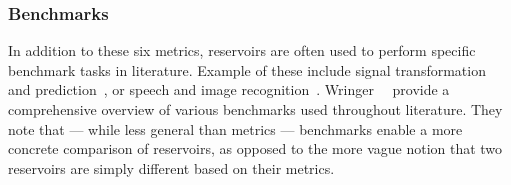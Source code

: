 \subsubsection{Benchmarks} %
In addition to these six metrics, reservoirs are often used to perform specific benchmark tasks in literature.
Example of these include signal transformation and prediction~\cite{AdaptiveProgrammableRC,jaeger2001echo,JaegerHaasWireless,RC_MemristorTemporal,Sunspots_Shougat,gartside2022reconfigurable,appeltant2011information,Vidamour2023}, or speech and image recognition~\cite{farronato2022reservoir,grollier2020neuromorphic,DynamicEmergence_NanomagneticSystem,Vidamour2023}. %
Wringer~\etal~\cite{RCbenchmarksReview1} provide a comprehensive overview of various benchmarks used throughout literature.
They note that --- while less general than metrics --- benchmarks enable a more concrete comparison of reservoirs, as opposed to the more vague notion that two reservoirs are simply different based on their metrics.

